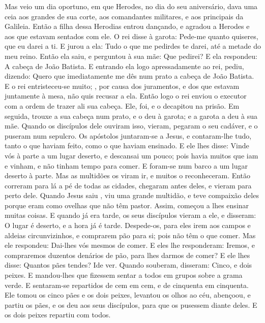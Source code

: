 {  Mas veio um dia oportuno, em que Herodes, no dia do seu aniversário, dava uma ceia aos grandes de sua corte, aos comandantes militares, e aos principais da Galileia.
  Então a filha dessa Herodias entrou dançando, e agradou a Herodes e aos que estavam sentados com ele. O rei disse à garota: Pede-me quanto quiseres, que eu darei a ti.
  E jurou a ela: Tudo o que me pedirdes te darei, até a metade do meu reino.
  Então ela saiu, e perguntou à sua mãe: Que pedirei? E ela respondeu: A cabeça de João Batista.
  E entrando ela logo apressadamente ao rei, pediu, dizendo: Quero que imediatamente me dês num prato a cabeça de João Batista.
  E o rei entristeceu-se muito;
{},  por causa dos juramentos, e dos que estavam juntamente à mesa, não quis recusar a ela.
  Então logo o rei enviou o executor com a ordem de trazer ali sua cabeça. Ele, foi, e o decapitou na prisão.
  Em seguida, trouxe a sua cabeça num prato, e o deu à garota; e a garota a deu à sua mãe.
  Quando os discípulos dele ouviram isso, vieram, pegaram o seu cadáver, e o puseram num sepulcro.
  Os apóstolos juntaram-se
{} a Jesus, e contaram-lhe tudo, tanto o que haviam feito, como o que haviam ensinado.
  E ele lhes disse: Vinde vós à parte a um lugar deserto, e descansai um pouco; pois havia muitos que iam e vinham, e não tinham tempo para comer.
  E foram-se num barco a um lugar deserto à parte.
  Mas as multidões os viram ir, e muitos o reconheceram. Então correram para lá a pé de todas as cidades, chegaram antes deles, e vieram para perto dele.
  Quando Jesus saiu
{},  viu uma grande multidão, e teve compaixão deles porque eram como ovelhas que não têm pastor. Assim, começou a lhes ensinar muitas coisas.
  E quando já era tarde, os seus discípulos vieram a ele, e disseram: O lugar é deserto, e a hora já é tarde.
  Despede-os, para eles irem aos campos e aldeias circunvizinhos, e comprarem pão para si; pois não têm o que comer.
  Mas ele respondeu: Dai-lhes vós mesmos de comer. E eles lhe responderam: Iremos, e compraremos duzentos denários de pão, para lhes darmos de comer?
  E ele lhes disse: Quantos pães tendes? Ide ver. Quando souberam, disseram: Cinco, e dois peixes.
  E mandou-lhes que fizessem sentar a todos em grupos sobre a grama verde.
  E sentaram-se repartidos de cem em cem, e de cinquenta em cinquenta.
  Ele tomou os cinco pães e os dois peixes, levantou os olhos ao céu, abençoou, e partiu os pães, e os deu aos seus discípulos, para que os pusessem diante deles. E os dois peixes repartiu com todos.
}
